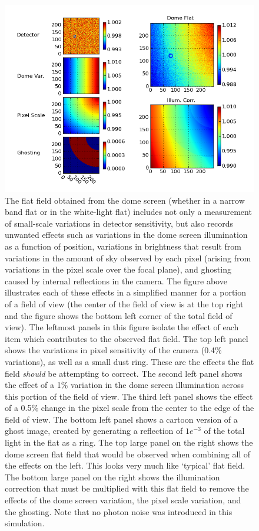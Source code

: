 \documentclass[12pt,preprint]{aastex}
\begin{document}
\begin{figure}[htbp]
\includegraphics[width=6in]{flatfield_corr}
\caption{ {\small
The flat field obtained from the dome screen (whether in a
narrow band flat or in the white-light flat) includes not only a
measurement of small-scale variations in detector sensitivity, but
also records unwanted effects such as variations in the dome screen
illumination as a function of position, variations in brightness that
result from variations in the amount of sky observed by each pixel
(arising from variations in the pixel scale over the focal plane), and
ghosting caused by internal reflections in the camera. The figure
above illustrates each of these effects in a simplified manner for a
portion of a field of view (the center of the field of view is at the
top right and the figure shows the bottom left corner of the total
field of view). 
 The leftmost panels in this figure isolate the effect of each item
 which contributes to the observed flat field. The top left panel shows the variations in pixel
sensitivity of the camera (0.4\% variations), as well as a small dust ring. These are the
effects the flat field {\it should} be attempting to correct. The
second left panel shows the effect of a 1\% variation in the dome
screen illumination across this portion of the field of view. The
third left panel shows the effect of a 0.5\% change in the pixel scale
from the center to the edge of the field of view.  The bottom left
panel shows a cartoon version of a ghost image, created by generating a
reflection of $1e^{-3}$ of the total light in the flat as a ring. 
The top large panel on the right shows the dome screen flat field that
would be observed when combining all of the effects on the left. This
looks very much like  `typical' flat field. The bottom large panel on
the right shows the illumination correction that must be multiplied with 
this flat field to remove the effects of the dome screen variation,
the pixel scale variation, and the ghosting.   Note that no photon noise was
introduced in this simulation.  \label{fig:flatfield}
} }
\end{figure}
\end{document}
